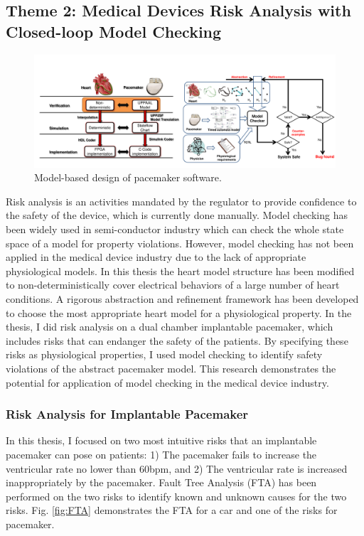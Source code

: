 \documentclass[a4paper]{article}
\begin{document}
\subsection{Theme 2: Medical Devices Risk Analysis with Closed-loop Model Checking}
\begin{figure}[t]
	\centering
	\includegraphics[scale=0.32]{figs/mb_mc.pdf}
	\caption{\small Model-based design of pacemaker software.}
	\label{fig:mb_mc}
\end{figure}
Risk analysis is an activities mandated by the regulator to provide confidence to the safety of the device, which is currently done manually.
Model checking has been widely used in semi-conductor industry which can check the whole state space of a model for property violations.
However, model checking has not been applied in the medical device industry due to the lack of appropriate physiological models.
In this thesis the heart model structure has been modified to non-deterministically cover electrical behaviors of a large number of heart conditions.
A rigorous abstraction and refinement framework has been developed to choose the most appropriate heart model for a physiological property.
In the thesis, I did risk analysis on a dual chamber implantable pacemaker, which includes risks that can endanger the safety of the patients.
By specifying these risks as physiological properties, I used model checking to identify safety violations of the abstract pacemaker model.
This research demonstrates the potential for application of model checking in the medical device industry.

\subsubsection{Risk Analysis for Implantable Pacemaker}
In this thesis, I focused on two most intuitive risks that an implantable pacemaker can pose on patients: 1) The pacemaker fails to increase the ventricular rate no lower than 60bpm, and 2) The ventricular rate is increased inappropriately by the pacemaker.
Fault Tree Analysis (FTA) has been performed on the two risks to identify known and unknown causes for the two risks. 
Fig. \ref{fig:FTA} demonstrates the FTA for a car and one of the risks for pacemaker.
\end{document}
